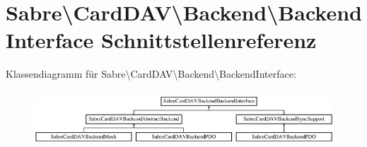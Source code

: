 \hypertarget{interface_sabre_1_1_card_d_a_v_1_1_backend_1_1_backend_interface}{}\section{Sabre\textbackslash{}Card\+D\+AV\textbackslash{}Backend\textbackslash{}Backend\+Interface Schnittstellenreferenz}
\label{interface_sabre_1_1_card_d_a_v_1_1_backend_1_1_backend_interface}
Klassendiagramm für Sabre\textbackslash{}Card\+D\+AV\textbackslash{}Backend\textbackslash{}Backend\+Interface\+:\begin{figure}[H]
\begin{center}
\leavevmode
\includegraphics[height=2.081784cm]{interface_sabre_1_1_card_d_a_v_1_1_backend_1_1_backend_interface}
\end{center}
\end{figure}
